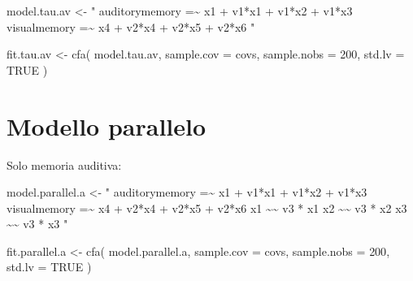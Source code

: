 \documentclass[
  11pt,
]{krantz}
\makeatletter
\newenvironment{Shaded}{\begin{snugshade}}{\end{snugshade}}
\newcommand{\AttributeTok}[1]{\textcolor[rgb]{0.61,0.61,0.61}{#1}}
\newcommand{\ConstantTok}[1]{\textcolor[rgb]{0,0,0}{#1}}
\newcommand{\DecValTok}[1]{\textcolor[rgb]{0.06,0.06,0.06}{#1}}
\newcommand{\FunctionTok}[1]{\textcolor[rgb]{0,0,0}{#1}}
\newcommand{\NormalTok}[1]{#1}
\newcommand{\OtherTok}[1]{\textcolor[rgb]{0.37,0.37,0.37}{#1}}
\newcommand{\StringTok}[1]{\textcolor[rgb]{0.5,0.5,0.5}{#1}}
\newenvironment{kframe}{%
\medskip{}
\setlength{\fboxsep}{.8em}
 \def\at@end@of@kframe{}%
 \ifinner\ifhmode%
  \def\at@end@of@kframe{\end{minipage}}%
  \begin{minipage}{\columnwidth}%
 \fi\fi%
 \def\FrameCommand##1{\hskip\@totalleftmargin \hskip-\fboxsep
 \colorbox{shadecolor}{##1}\hskip-\fboxsep
     \hskip-\linewidth \hskip-\@totalleftmargin \hskip\columnwidth}%
 \MakeFramed {\advance\hsize-\width
   \@totalleftmargin\z@ \linewidth\hsize
   \@setminipage}}%
 {\par\unskip\endMakeFramed%
 \at@end@of@kframe}
\renewenvironment{Shaded}{\begin{kframe}}{\end{kframe}}
\theoremstyle{definition}
\theoremstyle{definition}
\theoremstyle{definition}
\theoremstyle{definition}
\theoremstyle{remark}
\makeatother
\begin{document}
\begin{Shaded}
\begin{Highlighting}[]
\NormalTok{model.tau.av }\OtherTok{\textless{}{-}} \StringTok{"}
\StringTok{  auditorymemory =\textasciitilde{} x1 + v1*x1 + v1*x2 + v1*x3}
\StringTok{  visualmemory   =\textasciitilde{} x4 + v2*x4 + v2*x5 + v2*x6}
\StringTok{"}
\end{Highlighting}
\end{Shaded}

\begin{Shaded}
\begin{Highlighting}[]
\NormalTok{fit.tau.av }\OtherTok{\textless{}{-}} \FunctionTok{cfa}\NormalTok{(}
\NormalTok{  model.tau.av,}
  \AttributeTok{sample.cov =}\NormalTok{ covs,}
  \AttributeTok{sample.nobs =} \DecValTok{200}\NormalTok{,}
  \AttributeTok{std.lv =} \ConstantTok{TRUE}
\NormalTok{)}
\end{Highlighting}
\end{Shaded}

\hypertarget{modello-parallelo}{%
\section{Modello parallelo}\label{modello-parallelo}}

Solo memoria auditiva:

\begin{Shaded}
\begin{Highlighting}[]
\NormalTok{model.parallel.a }\OtherTok{\textless{}{-}} \StringTok{"}
\StringTok{  auditorymemory =\textasciitilde{} x1 + v1*x1 + v1*x2 + v1*x3}
\StringTok{  visualmemory   =\textasciitilde{} x4 + v2*x4 + v2*x5 + v2*x6}
\StringTok{  x1 \textasciitilde{}\textasciitilde{} v3 * x1}
\StringTok{  x2 \textasciitilde{}\textasciitilde{} v3 * x2}
\StringTok{  x3 \textasciitilde{}\textasciitilde{} v3 * x3}
\StringTok{"}
\end{Highlighting}
\end{Shaded}

\begin{Shaded}
\begin{Highlighting}[]
\NormalTok{fit.parallel.a }\OtherTok{\textless{}{-}} \FunctionTok{cfa}\NormalTok{(}
\NormalTok{  model.parallel.a,}
  \AttributeTok{sample.cov =}\NormalTok{ covs,}
  \AttributeTok{sample.nobs =} \DecValTok{200}\NormalTok{,}
  \AttributeTok{std.lv =} \ConstantTok{TRUE}
\NormalTok{)}
\end{Highlighting}
\end{Shaded}
\end{document}
